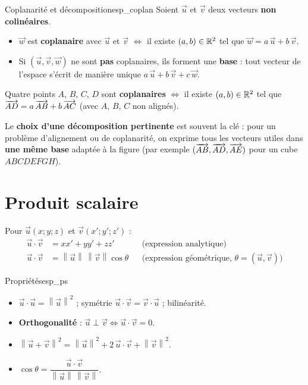 \begin{propriete}{Coplanarité et décomposition}{esp_coplan}
	Soient $\vec u$ et $\vec v$ deux vecteurs \textbf{non colinéaires}.
	\begin{itemize}[label=\textbullet]
		\item $\vec w$ est \textbf{coplanaire} avec $\vec u$ et $\vec v$ $\iff$
		il existe $(a,b) \in \mathbb{R}^2$ tel que $\vec w = a\,\vec u + b\,\vec v$.
		\item Si $(\vec u,\vec v,\vec w)$ ne sont \textbf{pas} coplanaires, ils
		forment une \textbf{base} : tout vecteur de l'espace s'écrit de manière
		unique $a\,\vec u + b\,\vec v + c\,\vec w$.
	\end{itemize}
	Quatre points $A$, $B$, $C$, $D$ sont \textbf{coplanaires} $\iff$ il existe
	$(a,b) \in \mathbb{R}^2$ tel que $\overrightarrow{AD} = a\,\overrightarrow{AB} + b\,\overrightarrow{AC}$
	(avec $A$, $B$, $C$ non alignés).
\end{propriete}

\begin{astucebac}
	Le \textbf{choix d'une décomposition pertinente} est souvent la clé :
	pour un problème d'alignement ou de coplanarité, on exprime tous les
	vecteurs utiles dans \textbf{une même base} adaptée à la figure (par
	exemple $(\overrightarrow{AB}, \overrightarrow{AD}, \overrightarrow{AE})$ pour un cube $ABCDEFGH$).
\end{astucebac}


\section{Produit scalaire}

\begin{definition}
	Pour $\vec u(x;y;z)$ et $\vec v(x';y';z')$ :
	$$
	\begin{aligned}
		\vec u \cdot \vec v &= x x' + y y' + z z'
		&&\text{(expression analytique)}\\
		\vec u \cdot \vec v &= \left\|\vec u\right\|\,\left\|\vec v\right\|\cos\theta
		&&\text{(expression géométrique, } \theta = (\vec u,\vec v) \text{)}
	\end{aligned}
	$$
\end{definition}

\begin{propriete}{Propriétés}{esp_ps}
	\begin{itemize}[label=\textbullet]
		\item $\vec u \cdot \vec u = \left\|\vec u\right\|^2$ ; symétrie
		$\vec u \cdot \vec v = \vec v \cdot \vec u$ ; bilinéarité.
		\item \textbf{Orthogonalité} : $\vec u \perp \vec v \iff \vec u \cdot \vec v = 0$.
		\item $\left\|\vec u + \vec v\right\|^2
		= \left\|\vec u\right\|^2 + 2\,\vec u\cdot\vec v + \left\|\vec v\right\|^2$.
		\item $\cos\theta = \dfrac{\vec u \cdot \vec v}{\left\|\vec u\right\|\,\left\|\vec v\right\|}$.
	\end{itemize}
\end{propriete}

